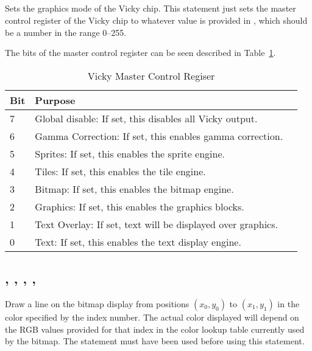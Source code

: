 \documentclass{report}
\begin{document}
    \subsection*{ }

    Sets the graphics mode of the Vicky chip.
    This statement just sets the master control register of the Vicky chip to
    whatever value is provided in , which should be a number in the range 0--255.

    The bits of the master control register can be seen described in Table~\ref{vicky_mcr}.

    \begin{table}[!htb]
        \begin{center}
            \begin{tabular}{|l|l|l|} \hline
                Bit & Purpose \\ \hline\hline
                7 & Global disable: If set, this disables all Vicky output. \\ \hline
                6 & Gamma Correction: If set, this enables gamma correction. \\ \hline
                5 & Sprites: If set, this enables the sprite engine. \\ \hline
                4 & Tiles: If set, this enables the tile engine. \\ \hline
                3 & Bitmap: If set, this enables the bitmap engine. \\ \hline
                2 & Graphics: If set, this enables the graphics blocks. \\ \hline
                1 & Text Overlay: If set, text will be displayed over graphics. \\ \hline
                0 & Text: If set, this enables the text display engine. \\ \hline
            \end{tabular}
            \caption{Vicky Master Control Regiser}
            \label{vicky_mcr}
        \end{center}
    \end{table}

    \subsection*{ , , , , }

    Draw a line on the bitmap display from positions $(x_0, y_0)$ to $(x_1, y_1)$ in the color
    specified by the  index number.
    The actual color displayed will depend on the RGB values provided for
    that index in the color lookup table currently used by the bitmap.
    The  statement must have been used before using
    this statement.
\end{document}
